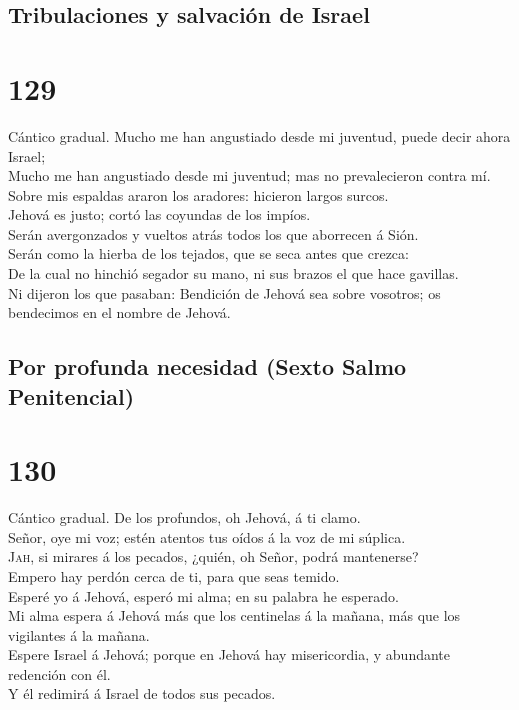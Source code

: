 \hypertarget{tribulaciones-y-salvaciuxf3n-de-israel}{%
\subsection{Tribulaciones y salvación de
Israel}\label{tribulaciones-y-salvaciuxf3n-de-israel}}

\hypertarget{section-128}{%
\section{129}\label{section-128}}

 Cántico gradual. Mucho me han angustiado desde mi
juventud, puede decir ahora Israel;\\
 Mucho me han angustiado desde mi juventud; mas no
prevalecieron contra mí.\\
 Sobre mis espaldas araron los aradores: hicieron largos
surcos.\\
 Jehová es justo; cortó las coyundas de los impíos.\\
 Serán avergonzados y vueltos atrás todos los que
aborrecen á Sión.\\
 Serán como la hierba de los tejados, que se seca antes
que crezca:\\
 De la cual no hinchió segador su mano, ni sus brazos el
que hace gavillas.\\
 Ni dijeron los que pasaban: Bendición de Jehová sea sobre
vosotros; os bendecimos en el nombre de Jehová.

\hypertarget{por-profunda-necesidad-sexto-salmo-penitencial}{%
\subsection{Por profunda necesidad (Sexto Salmo
Penitencial)}\label{por-profunda-necesidad-sexto-salmo-penitencial}}

\hypertarget{section-129}{%
\section{130}\label{section-129}}

 Cántico gradual. De los profundos, oh Jehová, á ti
clamo.\\
 Señor, oye mi voz; estén atentos tus oídos á la voz de mi
súplica.\\
 \textsc{Jah}, si mirares á los pecados, ¿quién, oh Señor,
podrá mantenerse?\\
 Empero hay perdón cerca de ti, para que seas temido.\\
 Esperé yo á Jehová, esperó mi alma; en su palabra he
esperado.\\
 Mi alma espera á Jehová más que los centinelas á la
mañana, más que los vigilantes á la mañana.\\
 Espere Israel á Jehová; porque en Jehová hay
misericordia, y abundante redención con él.\\
 Y él redimirá á Israel de todos sus pecados.

